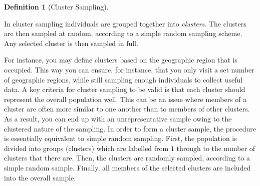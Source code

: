 \documentclass[
  letterpaper,
  DIV=11,
  numbers=noendperiod]{scrreprt}
\theoremstyle{definition}
\theoremstyle{definition}
\theoremstyle{definition}
\newtheorem{definition}{Definition}[chapter]
\theoremstyle{remark}
\begin{document}
\begin{definition}[Cluster
Sampling]\protect\hypertarget{def-cluster-sampling}{}\label{def-cluster-sampling}

In cluster sampling individuals are grouped together into
\emph{clusters}. The clusters are then sampled at random, according to a
simple random sampling scheme. Any selected cluster is then sampled in
full.

\end{definition}

For instance, you may define clusters based on the geographic region
that is occupied. This way you can ensure, for instance, that you only
visit a set number of geographic regions, while still sampling enough
individuals to collect useful data. A key criteria for cluster sampling
to be valid is that each cluster should represent the overall population
well. This can be an issue where members of a cluster are often more
similar to one another than to members of other clusters. As a result,
you can end up with an unrepresentative sample owing to the clustered
nature of the sampling. In order to form a cluster sample, the procedure
is essentially equivalent to simple random sampling. First, the
population is divided into groups (clusters) which are labelled from
\(1\) through to the number of clusters that there are. Then, the
clusters are randomly sampled, according to a simple random sample.
Finally, all members of the selected clusters are included into the
overall sample.
\end{document}
